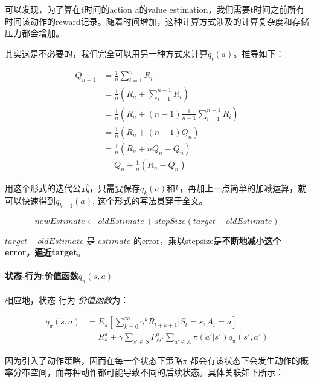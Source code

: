 \documentclass[UTF8,a4paper,12pt]{ctexbook}
\begin{document}
				可以发现，为了算在t时间的action a的value estimation，我们需要t时间之前所有时间该动作的reward记录。随着时间增加，这种计算方式涉及的计算复杂度和存储压力都会增加。
				
				其实这是不必要的，我们完全可以用另一种方式来计算$q_t(a)$。推导如下：
				
				$$\begin{aligned}
				Q_{n+1} &= \frac{1}{n}\sum_{i=1}^{n}R_i \\
				        &= \frac{1}{n}(R_n + \sum_{i=1}^{n-1}R_i) \\
				        &= \frac{1}{n}(R_n + (n-1)\frac{1}{n-1} \sum_{i=1}^{n-1}R_i) \\
				        &= \frac{1}{n}(R_n + (n-1)Q_n) \\
				        &= \frac{1}{n}(R_n + nQ_n-Q_n) \\
				        &= Q_n + \frac{1}{n}(R_n - Q_n)
				\end{aligned}
				$$
				
				用这个形式的迭代公式，只需要保存$q_k(a)$和$k$，再加上一点简单的加减运算，就可以快速得到$q_{k+1}(a)$, 这个形式的写法贯穿于全文。
				
				
				$$ newEstimate \gets oldEstimate + stepSize(target - oldEstimate)$$
				
				$target-oldEstimate$ 是 $estimate$ 的error，乘以stepsize是\textbf{不断地减小这个error，逼近target}。
				
				
			\paragraph{状态-行为:价值函数$q_\pi(s,a)$}
				相应地，状态-行为 \textit{价值函数}为：
				
				\begin{equation}
					\begin{aligned}
					q_\pi(s,a) &= E_\pi \left[\sum_{k=0}^{\infty}\gamma^k R_{t+k+1}|S_t = s, A_t = a \right]\\
							&= R_s^a + \gamma \sum_{s'\in S} P_{ss'}^a\sum_{a'\in A}\pi(a'|s')q_\pi(s', a')
					\end{aligned}
				\end{equation}
				
				因为引入了动作策略，因而在每一个状态下策略$\pi$ 都会有该状态下会发生动作的概率分布空间，而每种动作都可能导致不同的后续状态。具体关联如下所示：
				
\end{document}
